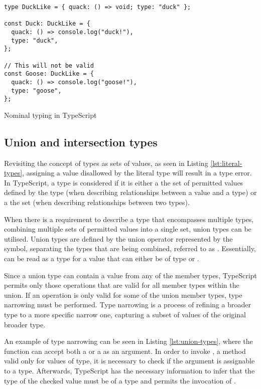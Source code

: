 \begin{listing}[ht]
  \begin{verbatim}
type DuckLike = { quack: () => void; type: "duck" };

const Duck: DuckLike = {
  quack: () => console.log("duck!"),
  type: "duck",
};

// This will not be valid
const Goose: DuckLike = {
  quack: () => console.log("goose!"),
  type: "goose",
};
\end{verbatim}
  \caption{Nominal typing in TypeScript}\label{lst:nominal-types-emulation}
\end{listing}

\subsection{Union and intersection types}\label{sec:union-intersection}

Revisiting the concept of types as sets of values, as seen in Listing \ref{lst:literal-types}, assigning a value disallowed by the literal type will result in a type error. In TypeScript, a type is considered  if it is either a  the set of permitted values defined by the type (when describing relationships between a value and a type) or a  the set (when describing relationships between two types).

When there is a requirement to describe a type that encompasses multiple types, combining multiple sets of permitted values into a single set, union types can be utilised. Union types are defined by the union operator represented by the \code{|} symbol, separating the types that are being combined, referred to as  \cite{DocumentationEverydayTypes}. Essentially,  can be read as a type for a value that can either be of type  or .

Since a union type can contain a value from any of the member types, TypeScript permits only those operations that are valid for all member types within the union. If an operation is only valid for some of the union member types, type narrowing must be performed. Type narrowing is a process of refining a broader type to a more specific narrow one, capturing a subset of values of the original broader type.

An example of type narrowing can be seen in Listing \ref{lst:union-types}, where the function  can accept both a  or a  as an argument. In order to invoke , a method valid only for values of  type, it is necessary to check if the argument is assignable to a  type. Afterwards, TypeScript has the necessary information to infer that the type of the checked value must be of a  type and permits the invocation of .

